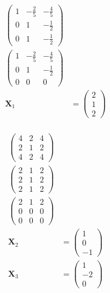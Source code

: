 \documentclass{article}
\begin{document}
\begin{align*}
  \begin{pmatrix}
    1 & -\frac{2}{5} & -\frac{4}{5} \\
    0 & 1            & -\frac{1}{2} \\
    0 & 1            & -\frac{1}{2}
  \end{pmatrix}                                                                                                                 \\
  \begin{pmatrix}
    1 & -\frac{2}{5} & -\frac{4}{5} \\
    0 & 1            & -\frac{1}{2} \\
    0 & 0            & 0
  \end{pmatrix}                                                                                                                 \\
  \mathbf{X}_1                           & = \begin{pmatrix}
                                               2 \\
                                               1 \\
                                               2
                                             \end{pmatrix}                                                                                       \\
\end{align*}

\begin{align*}
  \begin{pmatrix}
    4 & 2 & 4 \\
    2 & 1 & 2 \\
    4 & 2 & 4
  \end{pmatrix}                  \\
  \begin{pmatrix}
    2 & 1 & 2 \\
    2 & 1 & 2 \\
    2 & 1 & 2
  \end{pmatrix}                  \\
  \begin{pmatrix}
    2 & 1 & 2 \\
    0 & 0 & 0 \\
    0 & 0 & 0
  \end{pmatrix}                  \\
  \mathbf{X}_2 & = \begin{pmatrix}
                     1 \\
                     0 \\
                     -1
                   \end{pmatrix} \\
  \mathbf{X}_3 & = \begin{pmatrix}
                     1  \\
                     -2 \\
                     0
                   \end{pmatrix}
\end{align*}
\end{document}
